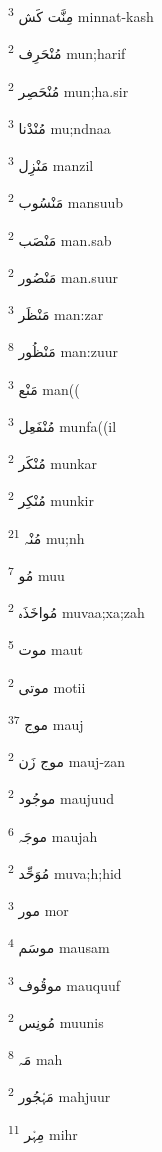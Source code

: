 \documentclass[12pt]{article}
\begin{document}
\begin{RTL}
\begin{multicols}{5}
{\ur مِنَّت کَش}   \textsuperscript{3} minnat-kash

{\ur مُنْحَرِف}   \textsuperscript{2} mun;harif

{\ur مُنْحَصِر}   \textsuperscript{2} mun;ha.sir

{\ur مُنْدْنا}   \textsuperscript{3} mu;ndnaa

{\ur مَنْزِل}   \textsuperscript{3} manzil

{\ur مَنْسُوب}   \textsuperscript{2} mansuub

{\ur مَنْصَب}   \textsuperscript{2} man.sab

{\ur مَنْصُور}   \textsuperscript{2} man.suur

{\ur مَنْظَر}   \textsuperscript{3} man:zar

{\ur مَنْظُور}   \textsuperscript{8} man:zuur

{\ur مَنْع}   \textsuperscript{3} man((

{\ur مُنْفَعِل}   \textsuperscript{3} munfa((il

{\ur مُنْکَر}   \textsuperscript{2} munkar

{\ur مُنْکِر}   \textsuperscript{2} munkir

{\ur مُنْہ}   \textsuperscript{21} mu;nh

{\ur مُو}   \textsuperscript{7} muu

{\ur مُواخَذَہ}   \textsuperscript{2} muvaa;xa;zah

{\ur موت}   \textsuperscript{5} maut

{\ur موتی}   \textsuperscript{2} motii

{\ur موج}   \textsuperscript{37} mauj

{\ur موج زَن}   \textsuperscript{2} mauj-zan

{\ur موجُود}   \textsuperscript{2} maujuud

{\ur موجَہ}   \textsuperscript{6} maujah

{\ur مُوَحِّد}   \textsuperscript{2} muva;h;hid

{\ur مور}   \textsuperscript{3} mor

{\ur موسَم}   \textsuperscript{4} mausam

{\ur موقُوف}   \textsuperscript{3} mauquuf

{\ur مُونِس}   \textsuperscript{2} muunis

{\ur مَہ}   \textsuperscript{8} mah

{\ur مَہْجُور}   \textsuperscript{2} mahjuur

{\ur مِہْر}   \textsuperscript{11} mihr


\end{multicols}
\end{RTL}
\end{document}
